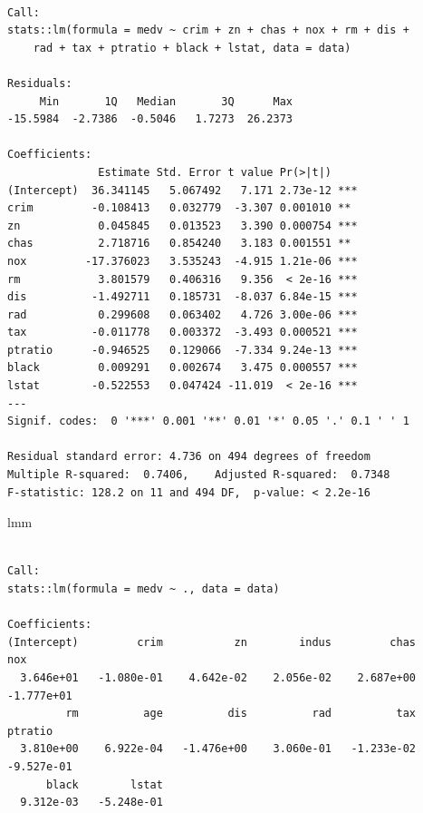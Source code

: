 \documentclass[
  letterpaper,
  DIV=11,
  numbers=noendperiod]{scrreprt}
\newenvironment{Shaded}{\begin{snugshade}}{\end{snugshade}}
\newcommand{\NormalTok}[1]{\textcolor[rgb]{0.33,0.33,0.33}{#1}}
\begin{document}
{\begin{verbatim}

Call:
stats::lm(formula = medv ~ crim + zn + chas + nox + rm + dis + 
    rad + tax + ptratio + black + lstat, data = data)

Residuals:
     Min       1Q   Median       3Q      Max 
-15.5984  -2.7386  -0.5046   1.7273  26.2373 

Coefficients:
              Estimate Std. Error t value Pr(>|t|)    
(Intercept)  36.341145   5.067492   7.171 2.73e-12 ***
crim         -0.108413   0.032779  -3.307 0.001010 ** 
zn            0.045845   0.013523   3.390 0.000754 ***
chas          2.718716   0.854240   3.183 0.001551 ** 
nox         -17.376023   3.535243  -4.915 1.21e-06 ***
rm            3.801579   0.406316   9.356  < 2e-16 ***
dis          -1.492711   0.185731  -8.037 6.84e-15 ***
rad           0.299608   0.063402   4.726 3.00e-06 ***
tax          -0.011778   0.003372  -3.493 0.000521 ***
ptratio      -0.946525   0.129066  -7.334 9.24e-13 ***
black         0.009291   0.002674   3.475 0.000557 ***
lstat        -0.522553   0.047424 -11.019  < 2e-16 ***
---
Signif. codes:  0 '***' 0.001 '**' 0.01 '*' 0.05 '.' 0.1 ' ' 1

Residual standard error: 4.736 on 494 degrees of freedom
Multiple R-squared:  0.7406,    Adjusted R-squared:  0.7348 
F-statistic: 128.2 on 11 and 494 DF,  p-value: < 2.2e-16
\end{verbatim}

\begin{Shaded}
\begin{Highlighting}[]
\NormalTok{lmm}
\end{Highlighting}
\end{Shaded}

\begin{verbatim}

Call:
stats::lm(formula = medv ~ ., data = data)

Coefficients:
(Intercept)         crim           zn        indus         chas          nox  
  3.646e+01   -1.080e-01    4.642e-02    2.056e-02    2.687e+00   -1.777e+01  
         rm          age          dis          rad          tax      ptratio  
  3.810e+00    6.922e-04   -1.476e+00    3.060e-01   -1.233e-02   -9.527e-01  
      black        lstat  
  9.312e-03   -5.248e-01  
\end{verbatim}
\end{document}
